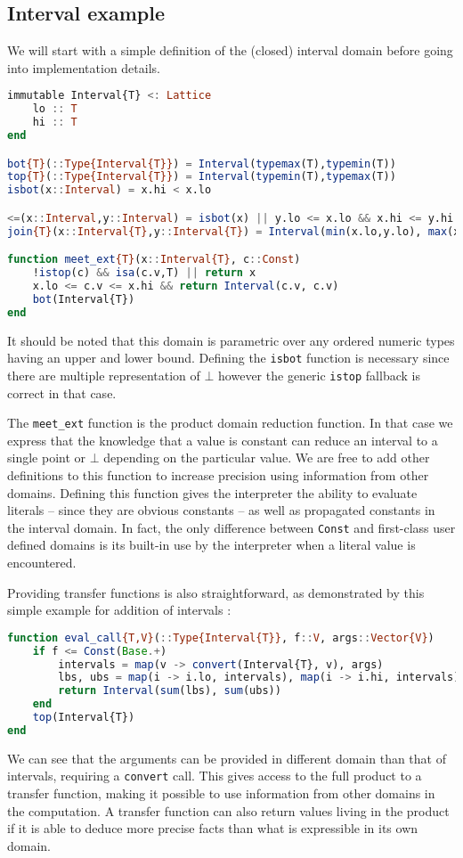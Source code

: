 \documentclass[11pt]{article}
\begin{document}
\subsection*{Interval example}
We will start with a simple definition of the (closed) interval domain before going into implementation details.
\begin{singlespace}
\begin{lstlisting}[language=julia]
immutable Interval{T} <: Lattice
    lo :: T
    hi :: T
end

bot{T}(::Type{Interval{T}}) = Interval(typemax(T),typemin(T))
top{T}(::Type{Interval{T}}) = Interval(typemin(T),typemax(T))
isbot(x::Interval) = x.hi < x.lo

<=(x::Interval,y::Interval) = isbot(x) || y.lo <= x.lo && x.hi <= y.hi
join{T}(x::Interval{T},y::Interval{T}) = Interval(min(x.lo,y.lo), max(x.hi,y.hi))

function meet_ext{T}(x::Interval{T}, c::Const)
    !istop(c) && isa(c.v,T) || return x
    x.lo <= c.v <= x.hi && return Interval(c.v, c.v)
    bot(Interval{T})
end
\end{lstlisting}
\end{singlespace}
It should be noted that this domain is parametric over any ordered numeric types having an upper and lower bound. Defining the \verb~isbot~ function is necessary since there are multiple representation of $\bot$ however the generic \verb~istop~ fallback is correct in that case.

The \verb~meet_ext~ function is the product domain reduction function. In that case we express that the knowledge that a value is constant can reduce an interval to a single point or $\bot$ depending on the particular value. We are free to add other definitions to this function to increase precision using information from other domains.
Defining this function gives the interpreter the ability to evaluate literals -- since they are obvious constants -- as well as propagated constants in the interval domain. In fact, the only difference between \verb~Const~ and first-class user defined domains is its built-in use by the interpreter when a literal value is encountered. 

Providing transfer functions is also straightforward, as demonstrated by this simple example for addition of intervals :
\begin{singlespace}
\begin{lstlisting}[language=julia]
function eval_call{T,V}(::Type{Interval{T}}, f::V, args::Vector{V})
    if f <= Const(Base.+)
        intervals = map(v -> convert(Interval{T}, v), args)
        lbs, ubs = map(i -> i.lo, intervals), map(i -> i.hi, intervals)
        return Interval(sum(lbs), sum(ubs))
    end
    top(Interval{T})
end
\end{lstlisting}
\end{singlespace}
We can see that the arguments can be provided in different domain than that of intervals, requiring a \verb~convert~ call. This gives access to the full product to a transfer function, making it possible to use information from other domains in the computation. A transfer function can also return values living in the product if it is able to deduce more precise facts than what is expressible in its own domain.
\end{document}
